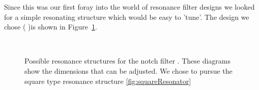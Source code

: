 Since this was our first foray into the world of resonance filter designs we looked for a simple resonating structure which would be easy to 'tune'. The design we chose (\cite{splitRingClassic} )is shown in Figure~\ref{fig:squareRingResonator}.

\begin{figure}[ht]
 \centering
 \\
 \caption{Possible resonance structures for the notch filter \cite{splitRingClassic}. These diagrams show the dimensions that can be adjusted. We chose to pursue the square type resonance structure \ref{fig:squareResonator}}
 \label{fig:squareRingResonator}
\end{figure}

